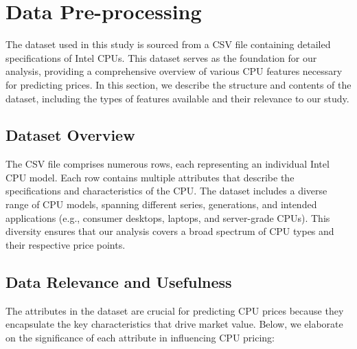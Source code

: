 \section{Data Pre-processing}
The dataset used in this study is sourced from a CSV file containing detailed specifications of Intel CPUs. This dataset serves as the foundation for our analysis, providing a comprehensive overview of various CPU features necessary for predicting prices. In this section, we describe the structure and contents of the dataset, including the types of features available and their relevance to our study.

\subsection{Dataset Overview}
The CSV file comprises numerous rows, each representing an individual Intel CPU model. Each row contains multiple attributes that describe the specifications and characteristics of the CPU. The dataset includes a diverse range of CPU models, spanning different series, generations, and intended applications (e.g., consumer desktops, laptops, and server-grade CPUs). This diversity ensures that our analysis covers a broad spectrum of CPU types and their respective price points.

\subsection{Data Relevance and Usefulness}

The attributes in the dataset are crucial for predicting CPU prices because they encapsulate the key characteristics that drive market value. Below, we elaborate on the significance of each attribute in influencing CPU pricing:

